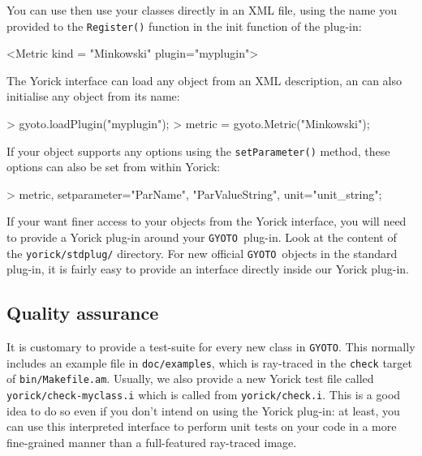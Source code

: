 \documentclass[a4paper,12pt]{article}
\providecommand{\GyotoSrcDir}{../..}
\newcommand{\GYOTO}{\texttt{GYOTO}}
\begin{document}
You can use then use your classes directly in an XML file, using the
name you provided to the \texttt{Register()} function in the init
function of the plug-in:
\begin{code}
   <Metric kind = "Minkowski" plugin="myplugin">
\end{code}
The Yorick interface can load any object from an XML description, an
can also initialise any object from its name:
\begin{code}
 > gyoto.loadPlugin("myplugin");
 > metric = gyoto.Metric("Minkowski");
\end{code}
If your object supports any options using the \texttt{setParameter()}
method, these options can also be set from within Yorick:
\begin{code}
 > metric, setparameter="ParName", "ParValueString", unit="unit_string";
\end{code}
If your want finer access to your objects from the Yorick interface,
you will need to provide a Yorick plug-in around your \GYOTO\
plug-in. Look at the content of the \texttt{yorick/stdplug/}
directory. For new official \GYOTO\ objects in the standard plug-in,
it is fairly easy to provide an interface directly inside our Yorick
plug-in.

\subsection{Quality assurance}

It is customary to provide a test-suite for every new class in
\GYOTO. This normally includes an example file in
\texttt{doc/examples}, which is ray-traced in the \texttt{check}
target of \texttt{bin/Makefile.am}. Usually, we also provide a new
Yorick test file called\\
\texttt{yorick/check-myclass.i} which is
called from \texttt{yorick/check.i}. This is a good idea to do so even
if you don't intend on using the Yorick plug-in: at least, you can use
this interpreted interface to perform unit tests on your code in a
more fine-grained manner than a full-featured ray-traced image.



\end{document}
